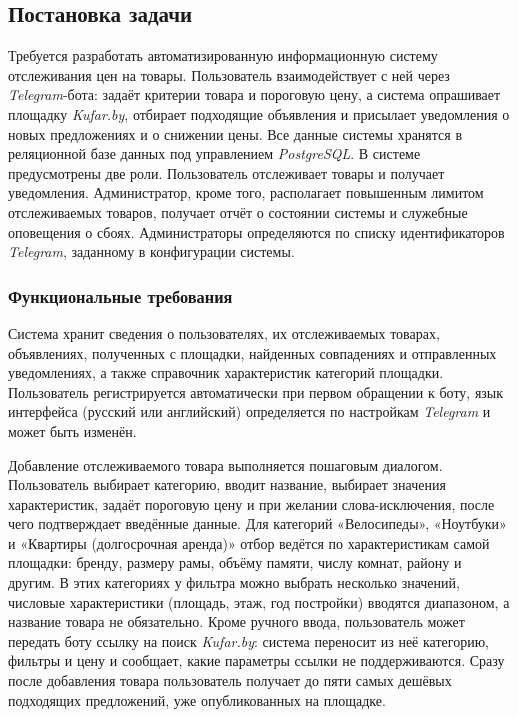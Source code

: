 \subsection{Постановка задачи}
\label{sec:analysis:specification}

Требуется разработать автоматизированную информационную систему отслеживания цен на товары. Пользователь взаимодействует с ней через \textit{Telegram}-бота: задаёт критерии товара и пороговую цену, а система опрашивает площадку \textit{Kufar.by}, отбирает подходящие объявления и присылает уведомления о новых предложениях и о снижении цены. Все данные системы хранятся в реляционной базе данных под управлением \textit{PostgreSQL}. В системе предусмотрены две роли. Пользователь отслеживает товары и получает уведомления. Администратор, кроме того, располагает повышенным лимитом отслеживаемых товаров, получает отчёт о состоянии системы и служебные оповещения о сбоях. Администраторы определяются по списку идентификаторов \textit{Telegram}, заданному в конфигурации системы.

\subsubsection{Функциональные требования}

Система хранит сведения о пользователях, их отслеживаемых товарах, объявлениях, полученных с площадки, найденных совпадениях и отправленных уведомлениях, а также справочник характеристик категорий площадки. Пользователь регистрируется автоматически при первом обращении к боту, язык интерфейса (русский или английский) определяется по настройкам \textit{Telegram} и может быть изменён.

Добавление отслеживаемого товара выполняется пошаговым диалогом. Пользователь выбирает категорию, вводит название, выбирает значения характеристик, задаёт пороговую цену и при желании слова-исключения, после чего подтверждает введённые данные. Для категорий «Велосипеды», «Ноутбуки» и «Квартиры (долгосрочная аренда)» отбор ведётся по характеристикам самой площадки: бренду, размеру рамы, объёму памяти, числу комнат, району и другим. В этих категориях у фильтра можно выбрать несколько значений, числовые характеристики (площадь, этаж, год постройки) вводятся диапазоном, а название товара не обязательно. Кроме ручного ввода, пользователь может передать боту ссылку на поиск \textit{Kufar.by}: система переносит из неё категорию, фильтры и цену и сообщает, какие параметры ссылки не поддерживаются. Сразу после добавления товара пользователь получает до пяти самых дешёвых подходящих предложений, уже опубликованных на площадке.

